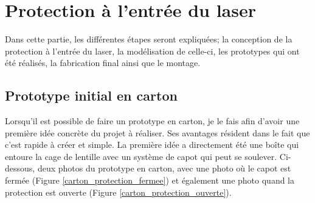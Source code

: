 
\begin{minipage}{\textwidth}
    \section{Protection à l'entrée du laser}
    Dans cette partie, les différentes étapes seront expliquées; la conception de la protection à l'entrée du laser, la modélisation de celle-ci, les prototypes qui ont été réalisés, la fabrication final ainsi que le montage.

    \subsection{Prototype initial en carton}
    Lorsqu'il est possible de faire un prototype en carton, je le fais afin d'avoir une première idée concrète du projet à réaliser. Ses avantages résident dans le fait que c'est rapide à créer et simple. La première idée a directement été une boîte qui entoure la cage de lentille avec un système de capot qui peut se soulever. Ci-dessous, deux photos du prototype en carton, avec une photo où le capot est fermée (Figure \ref{carton_protection_fermee}) et également une photo quand la protection est ouverte (Figure \ref{carton_protection_ouverte}).


\end{minipage}
